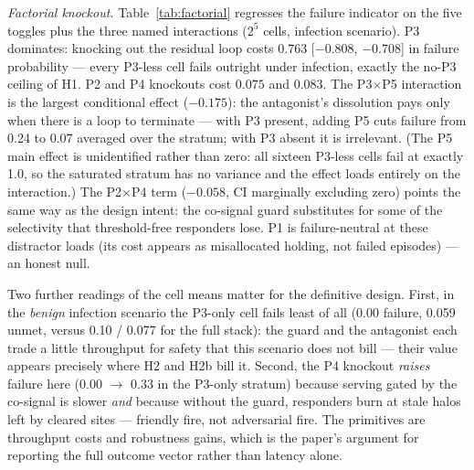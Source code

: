 \documentclass[twoside,twocolumn,usenatbib]{mnras}
\begin{document}
\emph{Factorial knockout.}  Table~\ref{tab:factorial} regresses the
failure indicator on the five toggles plus the three named
interactions ($2^5$ cells, infection scenario).  P3 dominates:
knocking out the residual loop costs $0.763$ [$-0.808$, $-0.708$] in
failure probability --- every P3-less cell fails outright under
infection, exactly the no-P3 ceiling of H1.  P2 and P4 knockouts cost
$0.075$ and $0.083$.  The P3$\times$P5 interaction is the largest
conditional effect ($-0.175$): the antagonist's dissolution pays only
when there is a loop to terminate --- with P3 present, adding P5 cuts
failure from 0.24 to 0.07 averaged over the stratum; with P3 absent
it is irrelevant.  (The P5 main effect is unidentified rather than
zero: all sixteen P3-less cells fail at exactly 1.0, so the saturated
stratum has no variance and the effect loads entirely on the
interaction.)  The P2$\times$P4 term ($-0.058$, CI marginally
excluding zero) points the same way as the design intent: the
co-signal guard substitutes for some of the selectivity that
threshold-free responders lose.  P1 is failure-neutral at these
distractor loads (its cost appears as misallocated holding, not
failed episodes) --- an honest null.

Two further readings of the cell means matter for the definitive
design.  First, in the \emph{benign} infection scenario the P3-only
cell fails least of all (0.00 failure, 0.059 unmet, versus 0.10 /
0.077 for the full stack): the guard and the antagonist each trade a
little throughput for safety that this scenario does not bill ---
their value appears precisely where H2 and H2b bill it.  Second, the
P4 knockout \emph{raises} failure here (0.00 $\to$ 0.33 in the
P3-only stratum) because serving gated by the co-signal is slower
\emph{and} because without the guard, responders burn at stale halos
left by cleared sites --- friendly fire, not adversarial fire.  The
primitives are throughput costs and robustness gains, which is the
paper's argument for reporting the full outcome vector rather than
latency alone.
\end{document}
